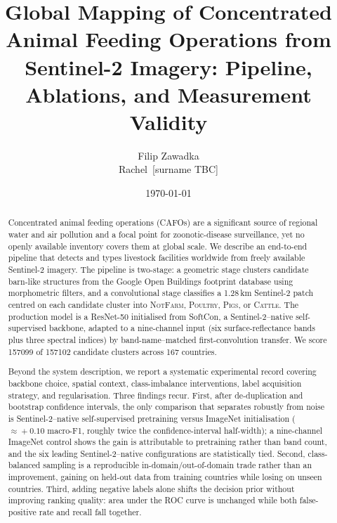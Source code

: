 \documentclass[11pt,a4paper]{article}
\title{Global Mapping of Concentrated Animal Feeding Operations from
       Sentinel-2 Imagery: Pipeline, Ablations, and Measurement Validity}
\author{Filip Zawadka \\ \small Rachel~[surname TBC]}
\date{\today}
\begin{document}
\maketitle

\begin{abstract}
Concentrated animal feeding operations (CAFOs) are a significant source of
regional water and air pollution and a focal point for zoonotic-disease
surveillance, yet no openly available inventory covers them at global scale.
We describe an end-to-end pipeline that detects and types livestock facilities
worldwide from freely available Sentinel-2 imagery. The pipeline is two-stage:
a geometric stage clusters candidate barn-like structures from the Google Open
Buildings footprint database using morphometric filters, and a convolutional
stage classifies a 1.28\,km Sentinel-2 patch centred on each candidate cluster
into \textsc{NotFarm}, \textsc{Poultry}, \textsc{Pigs}, or \textsc{Cattle}. The
production model is a ResNet-50 initialised from SoftCon, a Sentinel-2--native
self-supervised backbone, adapted to a nine-channel input (six surface-reflectance
bands plus three spectral indices) by band-name--matched first-convolution
transfer. We score \num{157099} of \num{157102} candidate clusters across 167
countries.

Beyond the system description, we report a systematic experimental record
covering backbone choice, spatial context, class-imbalance interventions, label
acquisition strategy, and regularisation. Three findings recur. First, after
de-duplication and bootstrap confidence intervals, the only comparison that
separates robustly from noise is Sentinel-2--native self-supervised pretraining
versus ImageNet initialisation ($\approx\!+0.10$ macro-F1, roughly twice the
confidence-interval half-width); a nine-channel ImageNet control shows the gain
is attributable to pretraining rather than band count, and the six leading
Sentinel-2--native configurations are statistically tied. Second, class-balanced
sampling is a reproducible in-domain/out-of-domain trade rather than an
improvement, gaining on held-out data from training countries while losing on
unseen countries. Third, adding negative labels alone shifts the decision prior
without improving ranking quality: area under the ROC curve is unchanged while
both false-positive rate and recall fall together.


\end{abstract}
\end{document}
